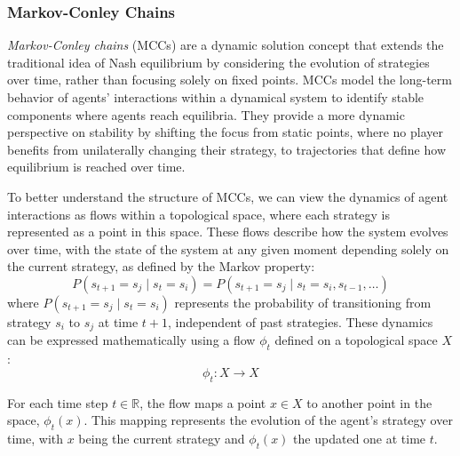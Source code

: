     \subsubsection{Markov-Conley Chains}

        \emph{Markov-Conley chains} (MCCs) are a dynamic solution concept that extends the traditional idea of Nash equilibrium by considering the evolution of strategies over time, rather than focusing solely on fixed points. MCCs model the long-term behavior of agents’ interactions within a dynamical system to identify stable components where agents reach equilibria. They provide a more dynamic perspective on stability by shifting the focus from static points, where no player benefits from unilaterally changing their strategy, to trajectories that define how equilibrium is reached over time.\tinydouble

        \noindent
        To better understand the structure of MCCs, we can view the dynamics of agent interactions as flows within a topological space, where each strategy is represented as a point in this space. These flows describe how the system evolves over time, with the state of the system at any given moment depending solely on the current strategy, as defined by the Markov property:
        \begin{equation}
            P(s_{t+1} = s_j \mid s_t = s_i) = P(s_{t+1} = s_j \mid s_t = s_i, s_{t-1}, \dots)
            \label{eq:markov_property}
        \end{equation}
        where $P(s_{t+1} = s_j \mid s_t = s_i)$ represents the probability of transitioning from strategy $s_i$ to $s_j$ at time $t+1$, independent of past strategies. These dynamics can be expressed mathematically using a flow $\phi_t$ defined on a topological space $X$:
        \begin{equation}
            \phi_t: X \rightarrow X
            \label{eq:flow_phi}
        \end{equation}

        \noindent
        For each time step $t \in \mathbb{R}$, the flow maps a point $x \in X$ to another point in the space, $\phi_t(x)$. This mapping represents the evolution of the agent’s strategy over time, with $x$ being the current strategy and $\phi_t(x)$ the updated one at time $t$.\tinydouble
        
